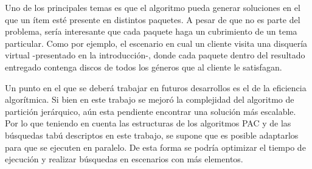 Uno de los principales temas es que el algoritmo pueda generar soluciones en el que un ítem esté presente en distintos paquetes. A pesar de que no es parte del problema, sería interesante que cada paquete haga un cubrimiento de un tema particular. Como por ejemplo, el escenario en cual un cliente visita una disquería virtual -presentado en la introducción-, donde cada paquete dentro del resultado entregado contenga discos de todos los géneros que al cliente le satisfagan.

Un punto en el que se deberá trabajar en futuros desarrollos es el de la eficiencia algorítmica. Si bien en este trabajo se mejoró la complejidad del algoritmo de partición jerárquico, aún esta pendiente encontrar una solución más escalable. Por lo que teniendo en cuenta las estructuras de los algoritmos PAC y de las búsquedas tabú descriptos en este trabajo, se supone que es posible adaptarlos para que se ejecuten en paralelo. De esta forma se podría optimizar el tiempo de ejecución y realizar búsquedas en escenarios con más elementos.